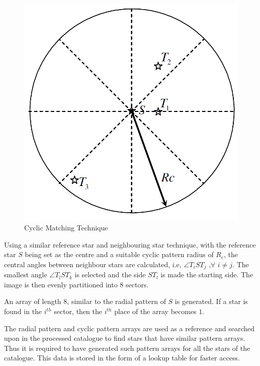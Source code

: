 \documentclass[../../main.tex]{subfiles}
\begin{document}
\begin{itemize}
    \begin{figure}[!h]
        \centering
        \includegraphics[scale=0.35]{Figures/GNC/cyclic_technique.PNG}
        \caption{Cyclic Matching Technique}
        \label{fig:cyclic}
    \end{figure}
    
    Using a similar reference star and neighbouring star technique, with the reference star $S$ being set as the centre and a suitable cyclic pattern radius of $R_c$, the central angles between neighbour stars are calculated, i.e, $\angle T_i S T_j$ ,$\forall$ $i\neq j$. The smallest angle $\angle T_l S T_k$ is selected and the side $ST_l$ is made the starting side. The image is then evenly partitioned into $8$ sectors. 
    
    An array of length $8$, similar to the radial pattern of $S$ is generated. If a star is found in the $i^{th}$ sector, then the $i^{th}$ place of the array becomes $1$.

\end{itemize}

The radial pattern and cyclic pattern arrays are used as a reference and searched upon in the processed catalogue to find stars that have similar pattern arrays. Thus it is required to have generated such pattern arrays for all the stars of the catalogue. This data is stored in the form of a lookup table for faster access.
\end{document}
